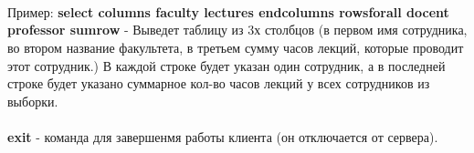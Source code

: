 \documentclass[11pt]{article}
\begin{document}
\\\\\\Пример: \textbf{select columns faculty lectures end\textunderscore{}columns rows\textunderscore{}for\textunderscore{}all docent professor sum\textunderscore{}row} - Выведет таблицу из 3х столбцов (в первом имя сотрудника, во втором название факультета, в третьем сумму часов лекций, которые проводит этот сотрудник.) В каждой строке будет указан один сотрудник, а в последней строке будет указано суммарное кол-во часов лекций у всех сотрудников из выборки.\\\\
\textbf{exit} - команда для завершенмя работы клиента (он отключается от сервера).
\end{document}
